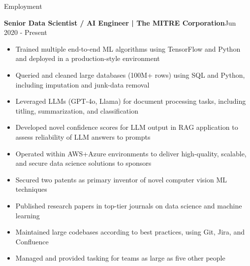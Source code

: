 \documentclass{resume} %
\begin{document}
\begin{rSection}{Employment}

\textbf{Senior Data Scientist / AI Engineer | The MITRE Corporation}\hfill Jun 2020 - Present
\begin{itemize}
    \item Trained multiple end-to-end ML algorithms using TensorFlow and Python and deployed in a production-style environment
    \item Queried and cleaned large databases (100M+ rows) using SQL and Python, including imputation and junk-data removal
    \item Leveraged LLMs (GPT-4o, Llama) for document processing tasks, including titling, summarization, and classification
    \item Developed novel confidence scores for LLM output in RAG application to assess reliability of LLM answers to prompts
    \item Operated within AWS+Azure environments to deliver high-quality, scalable, and secure data science solutions to sponsors
    \item Secured two patents as primary inventor of novel computer vision ML techniques
    \item Published research papers in top-tier journals on data science and machine learning
    \item Maintained large codebases according to best practices, using Git, Jira, and Confluence
    \item Managed and provided tasking for teams as large as five other people
\end{itemize} 

\end{rSection}
\end{document}
